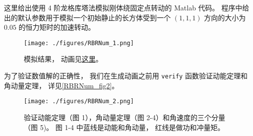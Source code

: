 

这里给出使用 4 阶龙格库塔法模拟刚体绕固定点转动的 Matlab 代码。 程序中给出的默认参数用于模拟一个初始静止的长方体受到一个 $(1,1,1)$ 方向的大小为 $0.05$ 的恒力矩时的加速转动。

\begin{figure}[ht]
\centering
\texttt{[image: ./figures/RBRNum\_1.png]}
\caption{模拟结果， 动画见\href{https://wuli.wiki/apps/rigBdRot.html}{这里}。} \label{RBRNum_fig1}
\end{figure}

为了验证数值解的正确性， 我们在生成动画之前用 \verb|verify| 函数验证动能定理和角动量定理， 详见\autoref{RBRNum_fig2}。
\begin{figure}[ht]
\centering
\texttt{[image: ./figures/RBRNum\_2.png]}
\caption{验证动能定理（图 1），角动量定理（图 2-4）和角速度的三个分量（图 5)。 图 1-4 中蓝线是动能和角动量， 红线是做功和冲量矩。} \label{RBRNum_fig2}
\end{figure}

